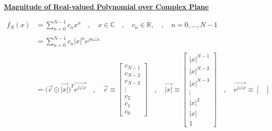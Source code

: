 \documentclass{article}
\begin{document}
\textbf{\underline{Magnitude of Real-valued Polynomial over Complex Plane}}

\begin{align*}
    f_{N}(x)&= \sum^{N - 1}_{n = 0}c_{n}x^{n} \quad , \quad x \in \mathbb{C} \quad , \quad c_n \in \mathbb{R}, \quad , \quad n = 0, ..., N - 1 \\ \\
            &= \sum^{N - 1}_{n = 0}c_{n}|x|^{n}e^{jn\angle{x}} \\ \\
            &= \Big(\vec{c} \odot \vec{|x|}\Big)^{T}\vec{e^{j\angle{x}}} \quad , \quad
                                     \vec{c} \equiv \begin{bmatrix}
                                                        c_{N - 1} \\
                                                        c_{N - 2} \\
                                                        c_{N - 3} \\
                                                        \vdots \\
                                                        c_{2} \\
                                                        c_{1} \\
                                                        c_{0}
                                                      \end{bmatrix} \quad , \quad
                                   \vec{|x|} \equiv \begin{bmatrix}
                                                        |x|^{N - 1} \\
                                                        |x|^{N - 2} \\
                                                        |x|^{N - 3} \\
                                                        \vdots \\
                                                        |x|^{2} \\
                                                        |x| \\
                                                        1
                                                      \end{bmatrix} \quad , \quad
                \vec{e^{j\angle{x}}} \equiv \begin{bmatrix}

\end{bmatrix}
\end{align*}
\end{document}
